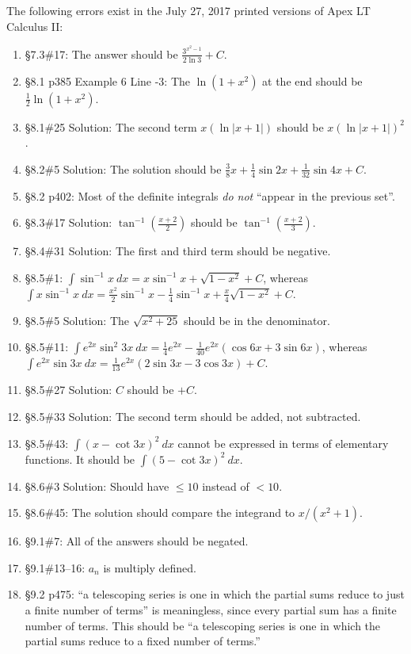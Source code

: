 \documentclass{amsart}
\newcommand{\ds}{\displaystyle}
\newcommand{\abs}[1]{\left\lvert#1\right\rvert}
\begin{document}
The following errors exist in the July 27, 2017 printed versions of Apex LT Calculus II:
\begin{enumerate}
\item \S7.3\#17: The answer should be $\frac{3^{x^2-1}}{2\ln3}+C$.
\item \S8.1 p385 Example 6 Line -3: The $\ln(1+x^2)$ at the end should be $\frac12\ln(1+x^2)$.
\item \S8.1\#25 Solution: The second term $x\left(\ln\abs{x+1}\right)$ should be $x\left(\ln\abs{x+1}\right)^2$.
\item \S8.2\#5 Solution: The solution should be $\frac38 x+\frac14\sin2x+\frac1{32}\sin4x+C$.
\item \S8.2 p402: Most of the definite integrals \emph{do not} ``appear in the previous set''.
\item \S8.3\#17 Solution: $\tan^{-1}\left(\frac{x+2}2\right)$ should be $\tan^{-1}\left(\frac{x+2}3\right)$.
\item \S8.4\#31 Solution: The first and third term should be negative.
\item \S8.5\#1: $\int \sin^{-1}x\ dx=x\sin^{-1}x+\sqrt{1-x^2}+C$, whereas\\
$\int x\sin^{-1}x\ dx=\frac{x^2}{2} \sin^{-1}x - \frac{1}{4} \sin^{-1}x + \frac{x}{4} \sqrt{1-x^2}+C$.
\item \S8.5\#5 Solution: The $\sqrt{x^2+25}$ should be in the denominator.
\item \S8.5\#11: $\int e^{2x}\sin^2 3x\ dx=\frac14e^{2x}-\frac1{40}e^{2x}(\cos6x+3\sin6x)$, whereas $\int e^{2x}\sin 3x\ dx=\frac{1}{13} e^{2x}(2 \sin 3x - 3\cos 3x) +C$.
\item \S8.5\#27 Solution: $C$ should be $+C$.
\item \S8.5\#33 Solution: The second term should be added, not subtracted.
\item \S8.5\#43: $\ds\int(x-\cot 3x)^2\ dx$ cannot be expressed in terms of elementary functions.  It should be $\ds\int (5- \cot 3x)^2\ dx$.
\item \S8.6\#3 Solution: Should have $\le10$ instead of $<10$.
\item \S8.6\#45: The solution should compare the integrand to $x/(x^2+1)$.
\item \S9.1\#7: All of the answers should be negated.
\item \S9.1\#13--16: $a_n$ is multiply defined.
\item \S9.2 p475: ``a telescoping series is one in which the partial sums reduce to just a finite number of terms'' is meaningless, since every partial sum has a finite number of terms.  This should be ``a telescoping series is one in which the partial sums reduce to a fixed number of terms.''

\end{enumerate}
\end{document}
